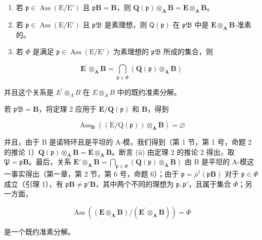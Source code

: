 \begin{enumerate}
\def\labelenumi{(\roman{enumi})}
\item
  若 \(\mathfrak{p} \in \operatorname{Ass}(\mathrm{E} / \mathrm{E}')\) 且 \(\mathfrak{p}\mathbf{B} = \mathbf{B}\)，则 \(\mathbf{Q}(\mathfrak{p}) \otimes_{\mathbf{A}} \mathbf{B} = \mathbf{E} \otimes_{\mathbf{A}} \mathbf{B}\)。
\item
  若 \(\mathfrak{p} \in \operatorname{Ass}(\mathrm{E} / \mathrm{E}')\) 且 \(\mathfrak{pB}\) 是素理想，则 \(\mathsf{Q}(\mathfrak{p})\) 在 \(\mathfrak{pB}\) 中是 \(\mathbf{E} \otimes_{\mathbf{A}} \mathbf{B}\)-准素的。
\item
  若 \(\Phi\) 是满足 \(\mathfrak{p} \in \operatorname{Ass}(\mathrm{E} / \mathrm{E}')\) 为素理想的 \(\mathfrak{pB}\) 所成的集合，则
\end{enumerate}

\[
\mathbf {E} ^ {\prime} \otimes_ {\mathbf {A}} \mathbf {B} = \bigcap_ {\mathfrak {p} \in \Phi} (\mathbf {Q} (\mathfrak {p}) \otimes_ {\mathbf {A}} \mathbf {B})
\]

并且这个关系是 \(E^{\prime} \otimes_{A} B\) 在 \(E \otimes_{A} B\) 中的既约准素分解。

若 \(\mathfrak{pB} = \mathbf{B}\)，将定理 2 应用于 \(\mathbf{E} / \mathbf{Q}(\mathfrak{p})\) 和 \(\mathbf{B}\)，得到

\[
\operatorname{Ass} _ {\mathbf {B}} ((\mathrm{E} / \mathrm{Q} (\mathfrak {p})) \otimes_ {\mathbf {A}} \mathbf {B}) = \varnothing
\]

并且，由于 B 是诺特环且是平坦的 A-模，我们得到（第 1 节，第 1 号，命题 2 的推论 1）\(\mathbf{Q}(\mathfrak{p}) \otimes_{\mathbf{A}} \mathbf{B} = \mathbf{E} \otimes_{\mathbf{A}} \mathbf{B}\)。断言 (ii) 由定理 2 的推论 2 得出，取 \(\mathfrak{P} = \mathfrak{p}\mathbf{B}\)。最后，关系 \(\mathbf{E}' \otimes_{\mathbf{A}} \mathbf{B} = \bigcap_{\mathfrak{p} \in \Phi} (\mathbf{Q}(\mathfrak{p}) \otimes_{\mathbf{A}} \mathbf{B})\) 由 B 是平坦的 A-模这一事实得出（第一章，第 2 节，第 6 号，命题 6）；由于 \(\mathfrak{p} = \overline{\rho}^{1}(\mathfrak{p}\mathbf{B})\) 对于 \(\mathfrak{p} \in \Phi\) 成立（引理 1），有 \(\mathfrak{p}\mathbf{B} \neq \mathfrak{p}'\mathbf{B}\)，其中两个不同的理想为 \(\mathfrak{p}, \mathfrak{p}'\)，且属于集合 \(\Phi\)；另一方面，

\[
\operatorname{Ass} ((\mathbf {E} \otimes_ {\mathbf {A}} \mathbf {B}) / (\mathbf {E} ^ {\prime} \otimes_ {\mathbf {A}} \mathbf {B})) = \Phi
\]

是一个既约准素分解。

